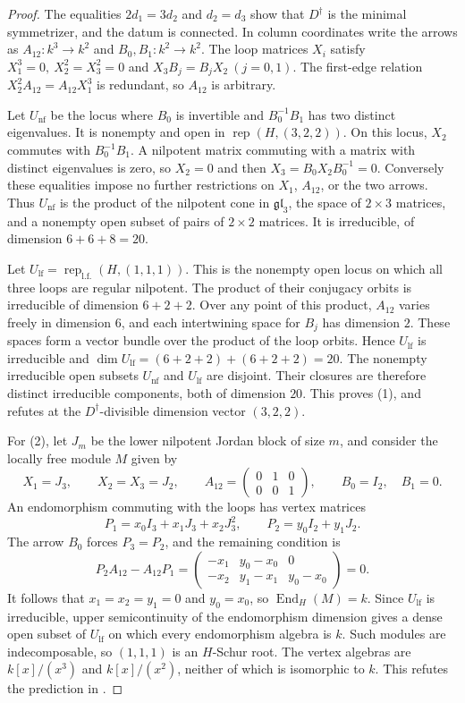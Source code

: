 \documentclass[11pt, reqno]{amsart}
\numberwithin{equation}{section}
\theoremstyle{definition}
\theoremstyle{remark}
\newcommand{\op}[1]{\operatorname{#1}}
\newcommand{\End}{\op{End}}
\newcommand{\Rep}{\op{rep}}
\begin{document}
\begin{proof}
The equalities $2d_1=3d_2$ and $d_2=d_3$ show that
$D^\dagger$ is the minimal symmetrizer, and the datum is connected.
In column coordinates write the arrows as
$A_{12}:k^3\to k^2$ and $B_0,B_1:k^2\to k^2$.
The loop matrices $X_i$ satisfy
$X_1^3=0,\ X_2^2=X_3^2=0$ and $X_3B_j=B_jX_2\ (j=0,1)$.
The first-edge relation $X_2^2A_{12}=A_{12}X_1^3$ is redundant,
so $A_{12}$ is arbitrary.

Let $U_{\mathrm{nf}}$ be the locus where $B_0$ is invertible
and $B_0^{-1}B_1$ has two distinct eigenvalues. It is nonempty
and open in $\Rep(H,(3,2,2))$. On this locus, $X_2$ commutes
with $B_0^{-1}B_1$. A nilpotent matrix commuting with a matrix
with distinct eigenvalues is zero, so $X_2=0$ and then
$X_3=B_0X_2B_0^{-1}=0$. Conversely these equalities impose no
further restrictions on $X_1$, $A_{12}$, or the two arrows.
Thus $U_{\mathrm{nf}}$ is the product of the nilpotent cone in
$\mathfrak{gl}_3$, the space of $2\times3$ matrices, and a
nonempty open subset of pairs of $2\times2$ matrices. It is
irreducible, of dimension $6+6+8=20$.

Let $U_{\mathrm{lf}}=\Rep_{\mathrm{l.f.}}(H,(1,1,1))$.
This is the nonempty open locus on which all three loops are
regular nilpotent. The product of their conjugacy orbits is
irreducible of dimension $6+2+2$. Over any point of this product,
$A_{12}$ varies freely in dimension $6$, and each intertwining
space for $B_j$ has dimension $2$. These spaces form a vector
bundle over the product of the loop orbits. Hence
$U_{\mathrm{lf}}$ is irreducible and
$\dim U_{\mathrm{lf}}=(6+2+2)+(6+2+2)=20$.
The nonempty irreducible open subsets $U_{\mathrm{nf}}$ and
$U_{\mathrm{lf}}$ are disjoint. Their closures are therefore
distinct irreducible components, both of dimension $20$.
This proves (1), and refutes
\cite[p.~23, Conjecture~5.1]{GLSII} at the
$D^\dagger$-divisible dimension vector $(3,2,2)$.

For (2), let $J_m$ be the lower nilpotent Jordan block of size
$m$, and consider the locally free module $M$ given by
\[
 X_1=J_3,\qquad X_2=X_3=J_2,\qquad
 A_{12}=\begin{pmatrix}0&1&0\\0&0&1\end{pmatrix},\qquad
 B_0=I_2,\quad B_1=0.
\]
An endomorphism commuting with the loops has vertex matrices
\[
 P_1=x_0I_3+x_1J_3+x_2J_3^2,
 \qquad P_2=y_0I_2+y_1J_2.
\]
The arrow $B_0$ forces $P_3=P_2$, and the remaining condition is
\[
 P_2A_{12}-A_{12}P_1
 =\begin{pmatrix}
   -x_1&y_0-x_0&0\\
   -x_2&y_1-x_1&y_0-x_0
  \end{pmatrix}=0.
\]
It follows that $x_1=x_2=y_1=0$ and $y_0=x_0$, so
$\End_H(M)=k$. Since $U_{\mathrm{lf}}$ is irreducible,
upper semicontinuity of the endomorphism dimension gives a
dense open subset of $U_{\mathrm{lf}}$ on which every
endomorphism algebra is $k$. Such modules are indecomposable,
so $(1,1,1)$ is an $H$-Schur root. The vertex algebras are
$k[x]/(x^3)$ and $k[x]/(x^2)$, neither of which is isomorphic to
$k$. This refutes the prediction in
\cite[p.~23, Section~5.4]{GLSII}.
\end{proof}
\end{document}

